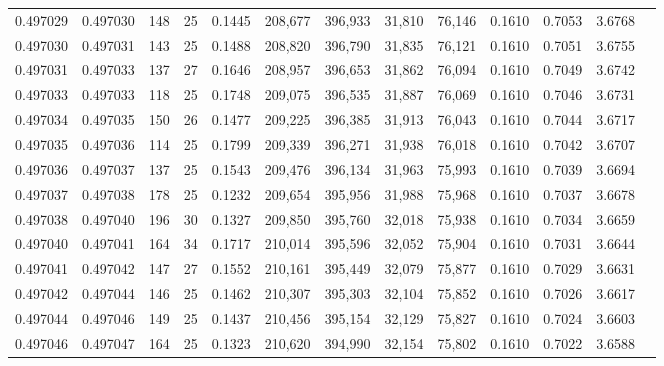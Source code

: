 \begin{tabular}{rrrrrrrrrrrrr}
0.497029 & 0.497030 & 148 &  25 &                                     0.1445 & 208,677 & 396,933 &  31,810 &  76,146 & 0.1610 & 0.7053 & 3.6768 \\
0.497030 & 0.497031 & 143 &  25 &                                     0.1488 & 208,820 & 396,790 &  31,835 &  76,121 & 0.1610 & 0.7051 & 3.6755 \\
0.497031 & 0.497033 & 137 &  27 &                                     0.1646 & 208,957 & 396,653 &  31,862 &  76,094 & 0.1610 & 0.7049 & 3.6742 \\
0.497033 & 0.497033 & 118 &  25 &                                     0.1748 & 209,075 & 396,535 &  31,887 &  76,069 & 0.1610 & 0.7046 & 3.6731 \\
0.497034 & 0.497035 & 150 &  26 &                                     0.1477 & 209,225 & 396,385 &  31,913 &  76,043 & 0.1610 & 0.7044 & 3.6717 \\
0.497035 & 0.497036 & 114 &  25 &                                     0.1799 & 209,339 & 396,271 &  31,938 &  76,018 & 0.1610 & 0.7042 & 3.6707 \\
0.497036 & 0.497037 & 137 &  25 &                                     0.1543 & 209,476 & 396,134 &  31,963 &  75,993 & 0.1610 & 0.7039 & 3.6694 \\
0.497037 & 0.497038 & 178 &  25 &                                     0.1232 & 209,654 & 395,956 &  31,988 &  75,968 & 0.1610 & 0.7037 & 3.6678 \\
0.497038 & 0.497040 & 196 &  30 &                                     0.1327 & 209,850 & 395,760 &  32,018 &  75,938 & 0.1610 & 0.7034 & 3.6659 \\
0.497040 & 0.497041 & 164 &  34 &                                     0.1717 & 210,014 & 395,596 &  32,052 &  75,904 & 0.1610 & 0.7031 & 3.6644 \\
0.497041 & 0.497042 & 147 &  27 &                                     0.1552 & 210,161 & 395,449 &  32,079 &  75,877 & 0.1610 & 0.7029 & 3.6631 \\
0.497042 & 0.497044 & 146 &  25 &                                     0.1462 & 210,307 & 395,303 &  32,104 &  75,852 & 0.1610 & 0.7026 & 3.6617 \\
0.497044 & 0.497046 & 149 &  25 &                                     0.1437 & 210,456 & 395,154 &  32,129 &  75,827 & 0.1610 & 0.7024 & 3.6603 \\
0.497046 & 0.497047 & 164 &  25 &                                     0.1323 & 210,620 & 394,990 &  32,154 &  75,802 & 0.1610 & 0.7022 & 3.6588 \\

\end{tabular}
